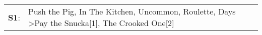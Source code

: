 \begin{supertabular}{p{0.03\textwidth}p{0.92\textwidth}}
 \textbf{S1}:  &  Push the Pig\textsuperscript{}, \enspace In The Kitchen\textsuperscript{}, \enspace Uncommon\textsuperscript{}, \enspace Roulette\textsuperscript{},  Days\textsuperscript{} \textgreater \enspace Pay the Snucka[1]\textsuperscript{}, \enspace The Crooked One[2]\textsuperscript{}  \enspace  \\
\end{supertabular}

